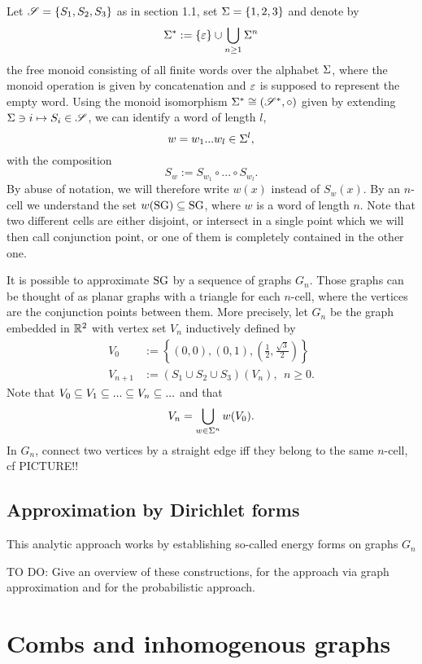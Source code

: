Let $\mathscr{S}=\{S_1,S_2,S_3\}$ as in section 1.1, set $\Sigma=\{1,2,3\}$ and denote by 
\[
  \Sigma^*:=\{\varepsilon\}\cup\bigcup_{n\geq 1}\Sigma^n
\]
the free monoid consisting of all finite words over the alphabet $\Sigma$, where the monoid operation is given by concatenation and $\varepsilon$ is supposed to represent the empty word. Using the monoid isomorphism 
$\Sigma^*\cong (\mathscr{S}^*,\circ)$ given by extending 
$\Sigma\ni i\mapsto S_i\in\mathscr{S}$, we can identify a word of length $l$,
\[
  w=w_1...w_l\in\Sigma^l,
\]
with the composition 
\[
  S_w:=S_{w_1}\circ...\circ S_{w_l}.
\]
By abuse of notation, we will therefore write $w(x)$ instead of $S_w(x)$. By an $n$-cell we understand the set $w(\operatorname{SG})\subseteq\operatorname{SG}$, where $w$ is a word of length $n$. Note that two different cells are either disjoint, or intersect in a single point which we will then call conjunction point, or one of them is completely contained in the other one. 

It is possible to approximate $\operatorname{SG}$ by a sequence of graphs $G_n$. Those graphs can be thought of as planar graphs with a triangle for each $n$-cell, where the vertices are the conjunction points between them. More precisely, let $G_n$ be the graph embedded in $\mathbb{R}^2$ with vertex set $V_n$ inductively defined by
\begin{align*}
  V_0&:=
  \left\{(0,0),(0,1),\left(\frac{1}{2},\frac{\sqrt{3}}{2}\right)\right\}\\
  V_{n+1}&:=(S_1\cup S_2\cup S_3)(V_n),\ \ n\geq0.
\end{align*}
Note that $V_0\subseteq V_1\subseteq...\subseteq V_n\subseteq ...$ and that
\[
  V_n=\bigcup_{w\in\Sigma^n} w(V_0).
\]
In $G_n$, connect two vertices by a straight edge iff they belong to the same $n$-cell, cf PICTURE!!



\subsection{Approximation by Dirichlet forms}

This analytic approach works by establishing so-called energy forms on graphs $G_n$

TO DO: Give an overview of these constructions, \cite{strichartz2006differential} for the approach via graph approximation and \cite{barlow1998diffusions} for the probabilistic approach.

\newpage

\section{Combs and inhomogenous graphs}

